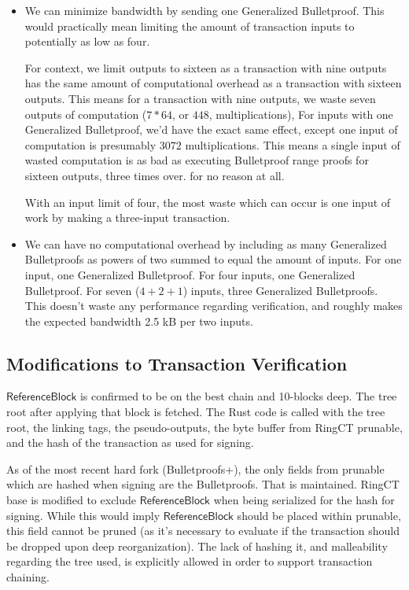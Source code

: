 \documentclass[]{article}
\begin{document}
\begin{itemize}
	\item
	We can minimize bandwidth by sending one Generalized Bulletproof. This would practically mean limiting the amount of transaction inputs to potentially as low as four.
	
	For context, we limit outputs to sixteen as a transaction with nine outputs has the same amount of computational overhead as a transaction with sixteen outputs. This means for a transaction with nine outputs, we waste seven outputs of computation ($7 * 64$, or $448$, multiplications), For inputs with one Generalized Bulletproof, we'd have the exact same effect, except one input of computation is presumably $3072$ multiplications. This means a single input of wasted computation is as bad as executing Bulletproof range proofs for sixteen outputs, three times over. for no reason at all.
	
	With an input limit of four, the most waste which can occur is one input of work by making a three-input transaction.
	\item
	We can have no computational overhead by including as many Generalized Bulletproofs as powers of two summed to equal the amount of inputs. For one input, one Generalized Bulletproof. For four inputs, one Generalized Bulletproof. For seven ($4 + 2 + 1$) inputs, three Generalized Bulletproofs. This doesn't waste any performance regarding verification, and roughly makes the expected bandwidth 2.5 kB per two inputs.
\end{itemize}

\subsection{Modifications to Transaction Verification}

$\mathsf{ReferenceBlock}$ is confirmed to be on the best chain and 10-blocks deep. The tree root after applying that block is fetched. The Rust code is called with the tree root, the linking tags, the pseudo-outputs, the byte buffer from RingCT prunable, and the hash of the transaction as used for signing.

As of the most recent hard fork (Bulletproofs+), the only fields from prunable which are hashed when signing are the Bulletproofs. That is maintained. RingCT base is modified to exclude $\mathsf{ReferenceBlock}$ when being serialized for the hash for signing. While this would imply $\mathsf{ReferenceBlock}$ should be placed within prunable, this field cannot be pruned (as it's necessary to evaluate if the transaction should be dropped upon deep reorganization). The lack of hashing it, and malleability regarding the tree used, is explicitly allowed in order to support transaction chaining.
\end{document}
